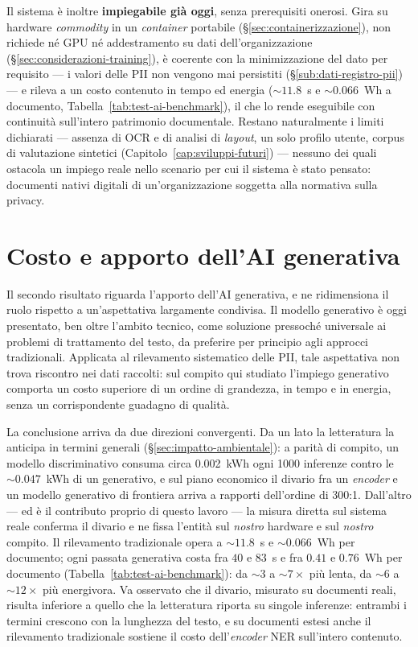 Il sistema è inoltre \textbf{impiegabile già oggi}, senza prerequisiti onerosi. Gira su hardware \textit{commodity} in un \textit{container} portabile (§\ref{sec:containerizzazione}), non richiede né GPU né addestramento su dati dell'organizzazione (§\ref{sec:considerazioni-training}), è coerente con la minimizzazione del dato per requisito --- i valori delle PII non vengono mai persistiti (§\ref{sub:dati-registro-pii}) --- e rileva a un costo contenuto in tempo ed energia (${\sim}11.8$~s e ${\sim}0.066$~Wh a documento, Tabella~\ref{tab:test-ai-benchmark}), il che lo rende eseguibile con continuità sull'intero patrimonio documentale. Restano naturalmente i limiti dichiarati --- assenza di OCR e di analisi di \textit{layout}, un solo profilo utente, corpus di valutazione sintetici (Capitolo~\ref{cap:sviluppi-futuri}) --- nessuno dei quali ostacola un impiego reale nello scenario per cui il sistema è stato pensato: documenti nativi digitali di un'organizzazione soggetta alla normativa sulla privacy.

\section{Costo e apporto dell'AI generativa}
\label{sec:risultati-ai}

Il secondo risultato riguarda l'apporto dell'AI generativa, e ne ridimensiona il ruolo rispetto a un'aspettativa largamente condivisa. Il modello generativo è oggi presentato, ben oltre l'ambito tecnico, come soluzione pressoché universale ai problemi di trattamento del testo, da preferire per principio agli approcci tradizionali. Applicata al rilevamento sistematico delle PII, tale aspettativa non trova riscontro nei dati raccolti: sul compito qui studiato l'impiego generativo comporta un costo superiore di un ordine di grandezza, in tempo e in energia, senza un corrispondente guadagno di qualità.

La conclusione arriva da due direzioni convergenti. Da un lato la letteratura la anticipa in termini generali (§\ref{sec:impatto-ambientale}): a parità di compito, un modello discriminativo consuma circa 0.002~kWh ogni 1000 inferenze contro le ${\sim}0.047$~kWh di un generativo, e sul piano economico il divario fra un \textit{encoder} e un modello generativo di frontiera arriva a rapporti dell'ordine di 300:1. Dall'altro --- ed è il contributo proprio di questo lavoro --- la misura diretta sul sistema reale conferma il divario e ne fissa l'entità sul \emph{nostro} hardware e sul \emph{nostro} compito. Il rilevamento tradizionale opera a ${\sim}11.8$~s e ${\sim}0.066$~Wh per documento; ogni passata generativa costa fra $40$ e $83$~s e fra $0.41$ e $0.76$~Wh per documento (Tabella~\ref{tab:test-ai-benchmark}): da ${\sim}3$ a ${\sim}7\times$ più lenta, da ${\sim}6$ a ${\sim}12\times$ più energivora. Va osservato che il divario, misurato su documenti reali, risulta inferiore a quello che la letteratura riporta su singole inferenze: entrambi i termini crescono con la lunghezza del testo, e su documenti estesi anche il rilevamento tradizionale sostiene il costo dell'\textit{encoder} NER sull'intero contenuto.

